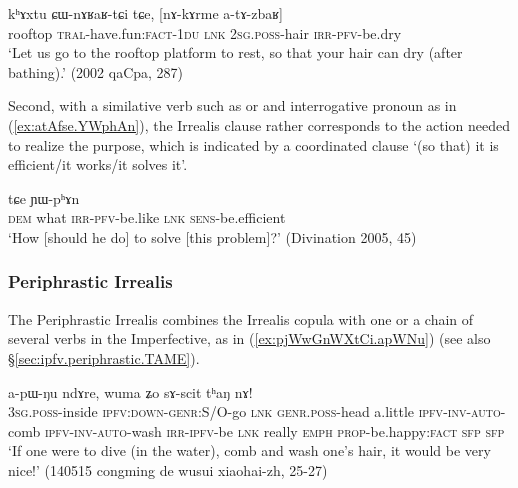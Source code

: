 \begin{exe}
\ex \label{ex:nAkArme.atAzbaR}
\gll kʰɤxtu ɕɯ-nɤʁaʁ-tɕi tɕe, [nɤ-kɤrme a-tɤ-zbaʁ] \\
rooftop \textsc{tral}-have.fun:\textsc{fact}-\textsc{1du} \textsc{lnk} \textsc{2sg}.\textsc{poss}-hair \textsc{irr}-\textsc{pfv}-be.dry \\
\glt `Let us go to the rooftop platform to rest, so that your hair can dry (after bathing).' (2002 qaCpa, 287)
\end{exe}

Second, with a similative verb such as  or  and interrogative pronoun as in (\ref{ex:atAfse.YWphAn}), the Irrealis clause rather corresponds to the action needed to realize the purpose, which is indicated by a coordinated clause  `(so that) it is efficient/it works/it solves it'. 

\begin{exe}
\ex \label{ex:atAfse.YWphAn}
 tɕe ɲɯ-pʰɤn \\
\textsc{dem} what \textsc{irr}-\textsc{pfv}-be.like \textsc{lnk} \textsc{sens}-be.efficient \\
\glt `How [should he do] to solve [this problem]?' (Divination 2005, 45)
\end{exe}
 
\subsubsection{Periphrastic Irrealis} \label{sec:irrealis.periphrastic}

The Periphrastic Irrealis combines the Irrealis copula  with one or a chain of several verbs in the Imperfective, as in (\ref{ex:pjWwGnWXtCi.apWNu}) (see also §\ref{sec:ipfv.periphrastic.TAME}). 

\begin{exe}
\ex \label{ex:pjWwGnWXtCi.apWNu}
 a-pɯ-ŋu ndɤre, wuma ʑo sɤ-scit tʰaŋ nɤ! \\
\textsc{3sg}.\textsc{poss}-inside \textsc{ipfv}:\textsc{down}-\textsc{genr}:S/O-go \textsc{lnk} \textsc{genr}.\textsc{poss}-head a.little \textsc{ipfv}-\textsc{inv}-\textsc{auto}-comb \textsc{ipfv}-\textsc{inv}-\textsc{auto}-wash \textsc{irr}-\textsc{ipfv}-be \textsc{lnk} really \textsc{emph} \textsc{prop}-be.happy:\textsc{fact} \textsc{sfp} \textsc{sfp} \\
\glt `If one were to dive (in the water), comb and wash one's hair, it would be very nice!' (140515 congming de wusui xiaohai-zh, 25-27)
\end{exe}

